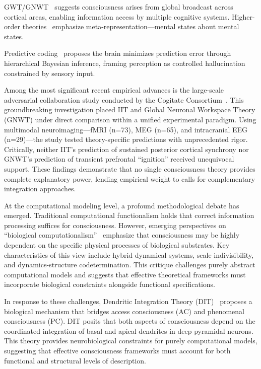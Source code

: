 \documentclass[10pt,journal,compsoc]{IEEEtran}
\begin{document}
GWT/GNWT~\cite{baars2005,dehaene2014} suggests consciousness arises from global broadcast across cortical areas, enabling information access by multiple cognitive systems. Higher-order theories~\cite{rosenthal2005} emphasize meta-representation—mental states about mental states.

Predictive coding~\cite{friston2010} proposes the brain minimizes prediction error through hierarchical Bayesian inference, framing perception as controlled hallucination constrained by sensory input.

Among the most significant recent empirical advances is the large-scale adversarial collaboration study conducted by the Cogitate Consortium~\cite{Melloni2025, Storm2024}. This groundbreaking investigation placed IIT and Global Neuronal Workspace Theory (GNWT) under direct comparison within a unified experimental paradigm. Using multimodal neuroimaging—fMRI (n=73), MEG (n=65), and intracranial EEG (n=29)—the study tested theory-specific predictions with unprecedented rigor. Critically, neither IIT's prediction of sustained posterior cortical synchrony nor GNWT's prediction of transient prefrontal ``ignition'' received unequivocal support. These findings demonstrate that no single consciousness theory provides complete explanatory power, lending empirical weight to calls for complementary integration approaches.

At the computational modeling level, a profound methodological debate has emerged. Traditional computational functionalism holds that correct information processing suffices for consciousness. However, emerging perspectives on ``biological computationalism''~\cite{Milinkovic2025} emphasize that consciousness may be highly dependent on the specific physical processes of biological substrates. Key characteristics of this view include hybrid dynamical systems, scale indivisibility, and dynamics-structure codetermination. This critique challenges purely abstract computational models and suggests that effective theoretical frameworks must incorporate biological constraints alongside functional specifications.

In response to these challenges, Dendritic Integration Theory (DIT)~\cite{Bachmann2020, Aru2020} proposes a biological mechanism that bridges access consciousness (AC) and phenomenal consciousness (PC). DIT posits that both aspects of consciousness depend on the coordinated integration of basal and apical dendrites in deep pyramidal neurons. This theory provides neurobiological constraints for purely computational models, suggesting that effective consciousness frameworks must account for both functional and structural levels of description.
\end{document}
